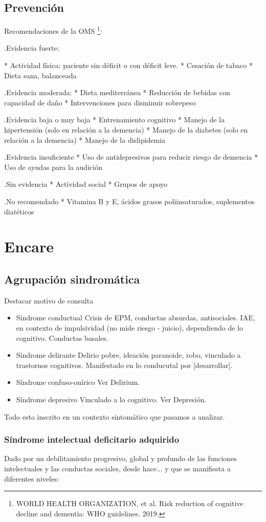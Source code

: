 \subsection*{Prevención}
Recomendaciones de la OMS \footnote{WORLD HEALTH ORGANIZATION, et al. Risk reduction of cognitive decline and dementia: WHO guidelines. 2019.}:

.Evidencia fuerte:

* Actividad física: paciente sin déficit o con déficit leve.
* Cesación de tabaco
* Dieta sana, balanceada

.Evidencia moderada:
* Dieta mediterránea
* Reducción de bebidas con capacidad de daño
* Intervenciones para disminuir sobrepeso

.Evidencia baja o muy baja
* Entrenamiento cognitivo
* Manejo de la hipertensión (solo en relación a la demencia)
* Manejo de la diabetes (solo en relación a la demencia)
* Manejo de la dislipidemia

.Evidencia insuficiente
* Uso de antidepresivos para reducir riesgo de demencia
* Uso de ayudas para la audición

.Sin evidencia
* Actividad social
* Grupos de apoyo

.No recomendado
* Vitamina B y E, ácidos grasos poliinsaturados, suplementos diatéticos

\section*{Encare}
\subsection*{Agrupación sindromática}
Destacar motivo de consulta
\begin{itemize}
	\item{Síndrome conductual} Crisis de EPM, conductas absurdas, antisociales. IAE, en contexto de impulsividad (no mide riesgo - juicio), dependiendo de lo cognitivo. Conductas basales.
	\item{Síndrome delirante} Delirio pobre, ideación paranoide, robo, vinculado a trastornos cognitivos. Manifestado en lo conducutal por [desarrollar].
	\item{Síndrome confuso-onírico} Ver Delirium.
	\item {Síndrome depresivo} Vinculado a lo cognitivo. Ver Depresión.
\end{itemize}
Todo esto inscrito en un contexto sintomático que pasamos a analizar.
\subsubsection*{Síndrome intelectual deficitario adquirido}
Dado por un debilitamiento progresivo, global y profundo de las funciones intelectuales y las conductas sociales, desde hace... y que se manifiesta a diferentes niveles:
